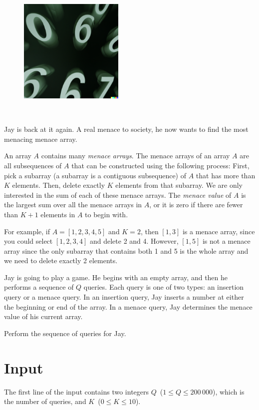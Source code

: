 
\begin{figure}
 \includegraphics[width=50mm]{img.png}
\end{figure}
~

Jay is back at it again. A real menace to society, he now wants to find the most
menacing menace array.

An array $A$ contains many \textit{menace arrays}. The menace arrays of an array $A$ are all subsequences of $A$ that can be constructed using the following process: First, pick a subarray (a subarray is a contiguous subsequence) of $A$ that has more than $K$ elements. Then, delete exactly $K$ elements from that subarray. We are only interested in the sum of each of these menace arrays. The \textit{menace value} of $A$ is the largest sum over all the menace arrays in $A$, or it is zero if there are fewer than $K + 1$ elements in $A$ to begin with.

For example, if $A = [1, 2, 3, 4, 5]$ and $K = 2$, then $[1, 3]$ is a menace array, since you could select $[1, 2, 3, 4]$ and delete 2 and 4. However, $[1, 5]$ is not a menace array since the only subarray that contains both 1 and 5 is the whole array and we need to delete exactly 2 elements.

Jay is going to play a game. He begins with an empty array, and then he performs a sequence of $Q$ queries. Each query is one of two types: an insertion query or a menace query. In an insertion query, Jay inserts a number at either the beginning or end of the array. In a menace query, Jay determines the menace value of his current array.

Perform the sequence of queries for Jay.


\section*{Input}

The first line of the input contains two integers $Q$~($1 \leq Q \leq 200\,000$), which is the number of queries, and $K$~($0 \leq K \leq 10$).

